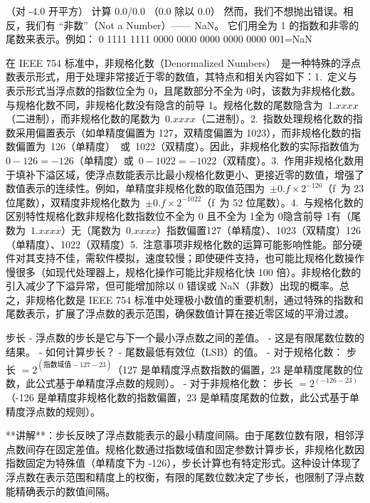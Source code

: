 \documentclass{ctexart}
\begin{document}
（对 -4.0 开平方）
计算 
0.0/0.0
（0.0 除以 0.0）
然而，我们不想抛出错误。相反，我们有 “非数”（Not a Number）—— NaN。
它们用全为 1 的指数和非零的尾数来表示。例如：
0 1111 1111 0000 0000 0000 0000 0000 001=NaN\par
在 IEEE 754 标准中，非规格化数（Denormalized Numbers） 是一种特殊的浮点数表示形式，用于处理非常接近于零的数值，其特点和相关内容如下：1. 定义与表示形式当浮点数的指数位全为 0，且尾数部分不全为 0时，该数为非规格化数。与规格化数不同，非规格化数没有隐含的前导 1。规格化数的尾数隐含为 \(1.xxxx\)（二进制），而非规格化数的尾数为 \(0.xxxx\)（二进制）。2. 指数处理规格化数的指数采用偏置表示（如单精度偏置为 127，双精度偏置为 1023），而非规格化数的指数偏置为 126（单精度） 或 1022（双精度）。因此，非规格化数的实际指数值为 \(0 - 126 = -126\)（单精度）或 \(0 - 1022 = -1022\)（双精度）。3. 作用非规格化数用于填补下溢区域，使浮点数能表示比最小规格化数更小、更接近零的数值，增强了数值表示的连续性。例如，单精度非规格化数的取值范围为 \(\pm 0.f \times 2^{-126}\)（f 为 23 位尾数），双精度非规格化数为 \(\pm 0.f \times 2^{-1022}\)（f 为 52 位尾数）。4. 与规格化数的区别特性规格化数非规格化数指数位不全为 0 且不全为 1全为 0隐含前导 1有（尾数为 \(1.xxxx\)）无（尾数为 \(0.xxxx\)）指数偏置127（单精度）、1023（双精度）126（单精度）、1022（双精度）5. 注意事项非规格化数的运算可能影响性能。部分硬件对其支持不佳，需软件模拟，速度较慢；即使硬件支持，也可能比规格化数操作慢很多（如现代处理器上，规格化操作可能比非规格化快 100 倍）。非规格化数的引入减少了下溢异常，但可能增加除以 0 错误或 NaN（非数）出现的概率。总之，非规格化数是 IEEE 754 标准中处理极小数值的重要机制，通过特殊的指数和尾数表示，扩展了浮点数的表示范围，确保数值计算在接近零区域的平滑过渡。\par

 步长  
- 浮点数的步长是它与下一个最小浮点数之间的差值。  
- 这是有限尾数位数的结果。  
- 如何计算步长？  
    - 尾数最低有效位（LSB）的值。  
    - 对于规格化数：  
        步长 \( = 2^{(\text{指数域值} - 127 - 23)} \)（127 是单精度浮点数指数的偏置，23 是单精度尾数的位数，此公式基于单精度浮点数的规则）。  
    - 对于非规格化数：  
        步长 \( = 2^{(-126 - 23)} \)（-126 是单精度非规格化数的指数偏置，23 是单精度尾数的位数，此公式基于单精度浮点数的规则）。  

**讲解**：步长反映了浮点数能表示的最小精度间隔。由于尾数位数有限，相邻浮点数间存在固定差值。规格化数通过指数域值和固定参数计算步长，非规格化数因指数固定为特殊值（单精度下为 -126），步长计算也有特定形式。这种设计体现了浮点数在表示范围和精度上的权衡，有限的尾数位数决定了步长，也限制了浮点数能精确表示的数值间隔。 
\end{document}
